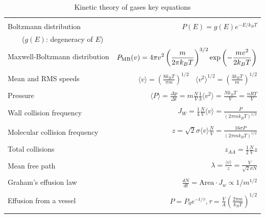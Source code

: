 \message{ !name(Outline.tex)}\documentclass[11pt]{article}
\begin{document}
\begin{outline}
\begin{table} 
\begin{center}
    \caption{Kinetic theory of gases key equations}
    \begin{tabular}{|lr|}
     \hline
 & \\
Boltzmann distribution & $\displaystyle P(E) = g(E) e^{-E/k_BT}$ \\ \ \ \ \ ($g(E)$: degeneracy of
$E$) & \\ 
Maxwell-Boltzmann distribution & $ \displaystyle
P_{\rm MB}(v) = 4\pi v^2 \left( \frac{m}{2\pi k_B T}\right)^{3/2}\exp\left(-\frac{m
    v^2}{2k_B T}\right) $ \\  & \\
Mean and RMS speeds & 

$\displaystyle \langle v \rangle = \left( \frac{8 k_B T}{\pi m} \right)^{1/2} \ \ \ \ \langle v^2
\rangle^{1/2} = \left( \frac{3 k_B T}{m} \right)^{1/2} $ \\  & \\

Pressure & $
\displaystyle \langle P \rangle = \frac{\Delta p}{\Delta t} = m \frac{N}{V}\frac{1}{3}\langle v^2
\rangle = \frac{N k_B T}{V}=\frac{n R T}{V} $ \\ & \\ 

Wall collision frequency &
$ \displaystyle  J_W = \frac{1}{4}\frac{N}{V}\langle v \rangle=\frac{P}{\left( 2 \pi m k_B
    T\right)^{1/2}} $ \\ & \\

Molecular collision frequency &
$ \displaystyle  z=\sqrt{2} \sigma \langle v \rangle\frac{N}{V} = \frac{16\sigma P}{\left( 2\pi m k_B T
  \right)^{1/2}} $ \\ & \\

Total collisions &
$ \displaystyle z_{AA} = \frac{1}{2} \frac{N}{V} z$ \\ & \\

Mean free path &
$\displaystyle \lambda = \frac{ \langle v \rangle}{z} = \frac{V}{\sqrt{2} \sigma N} $
\\ & \\

Graham's effusion law & $\displaystyle \frac{dN}{dt}=\text{Area}\cdot  J_w \propto 1/m^{1/2} $
\\ & \\
Effusion from a vessel & $\displaystyle P=P_0 e^{-t/\tau}, \tau = \frac{V}{A}\left
  (\frac{2\pi m}{k_B T}\right )^{1/2} $ \\ & \\ 


\end{tabular}
\end{center}
\end{table}
\end{outline}
\end{document}
